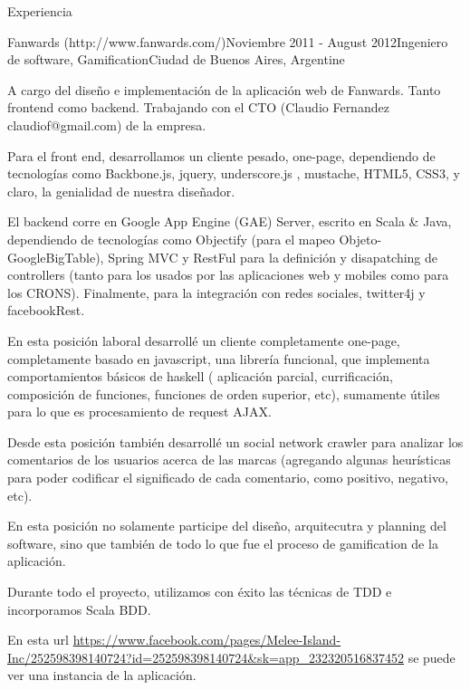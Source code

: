 \documentclass{resume} %
\begin{document}
\begin{rSection}{Experiencia}

\begin{rSubsection}{Fanwards (http://www.fanwards.com/)}{Noviembre 2011 - August 2012}{Ingeniero de software, Gamification}{Ciudad de Buenos Aires, Argentine}
\item A cargo del dise\~no e implementaci\'on de la aplicaci\'on web de Fanwards. Tanto frontend como backend. Trabajando con el CTO  (Claudio Fernandez claudiof@gmail.com) de la empresa.
\item Para el front end, desarrollamos un cliente pesado, one-page, dependiendo de tecnolog\'ias como Backbone.js, jquery, underscore.js , mustache, HTML5, CSS3, y claro, la genialidad de nuestra dise\~nador.
\item El backend corre en Google App Engine (GAE) Server, escrito en Scala \& Java,  dependiendo de tecnolog\'ias como Objectify (para el mapeo Objeto-GoogleBigTable), Spring MVC y RestFul para la definici\'on y disapatching de controllers (tanto para los usados por las aplicaciones web y mobiles como para los CRONS). Finalmente, para la integraci\'on con redes sociales, twitter4j y facebookRest.  
\item En esta posici\'on laboral desarroll\'e un cliente completamente one-page, completamente basado en javascript, una librer\'ia funcional, que implementa comportamientos b\'asicos de haskell ( aplicaci\'on parcial, currificaci\'on, composici\'on de funciones, funciones de orden superior, etc), sumamente \'utiles para lo que es procesamiento de request AJAX. 
\item Desde esta posici\'on tambi\'en desarroll\'e un social network crawler para analizar los comentarios de los usuarios acerca de las marcas (agregando algunas heur\'isticas para poder codificar el significado de cada comentario, como positivo, negativo, etc). 
\item En esta posici\'on no solamente participe del dise\~no, arquitecutra y planning del software, sino que tambi\'en de todo lo que fue el proceso de gamification de la aplicaci\'on.
\item Durante todo el proyecto, utilizamos con \'exito las t\'ecnicas de TDD e incorporamos Scala BDD. 
\item En esta url \url{https://www.facebook.com/pages/Melee-Island-Inc/252598398140724?id=252598398140724&sk=app_232320516837452} se puede ver una instancia de la aplicaci\'on.
\end{rSubsection}


\end{rSection}
\end{document}

